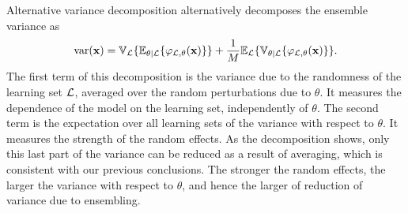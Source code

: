 \begin{remark}{Alternative variance decomposition}
\citet{geurts:2002} alternatively decomposes the ensemble variance as
\begin{equation}\label{eqn:4:variance-geurts}
\text{var}(\mathbf{x}) = \mathbb{V}_{\cal L} \{ \mathbb{E}_{\theta|{\cal L}} \{ \varphi_{{\cal L},\theta}(\mathbf{x}) \} \} + \frac{1}{M} \mathbb{E}_{\cal L} \{ \mathbb{V}_{\theta|{\cal L}} \{ \varphi_{{\cal L},\theta}(\mathbf{x}) \} \}.
\end{equation}
The first term of this decomposition is the variance due to the randomness
of the learning set ${\cal L}$, averaged over the random perturbations due to $\theta$. It
measures the dependence of the model on the learning set, independently of
$\theta$. The second term is the expectation over all learning sets of
the variance with respect to $\theta$. It measures the strength of the
random effects. As the decomposition shows, only this last part of the variance
can be reduced as a result of averaging, which is consistent with our previous
conclusions.  The stronger the random effects, the larger the variance with
respect to $\theta$, and hence the larger of reduction of variance due
to ensembling.


\end{remark}
